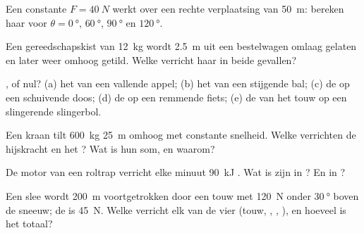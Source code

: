 \begin{exercise}[$\star$]\label{exo:g11:work-of-force:1}
Een constante  $F = \qty{40}{N}$ werkt over een rechte
verplaatsing van \qty{50}{m}: bereken haar  voor
$\theta = \qty{0}{\degree}$, $\qty{60}{\degree}$, $\qty{90}{\degree}$ en
$\qty{120}{\degree}$.
\end{exercise}

\begin{exercise}[$\star$]\label{exo:g11:work-of-force:2}
Een gereedschapskist van \qty{12}{kg} wordt \qty{2.5}{m} uit een
bestelwagen omlaag gelaten en later weer omhoog getild. Welke 
verricht haar  in beide gevallen?
\end{exercise}

\begin{exercise}[$\star$]\label{exo:g11:work-of-force:3}
,  of nul? (a) het  van een vallende appel; (b) het
 van een stijgende bal; (c) de  op een schuivende
doos; (d) de  op een remmende fiets; (e) de  van het
touw op een slingerende slingerbol.
\end{exercise}

\begin{exercise}[$\star$]\label{exo:g11:work-of-force:4}
Een kraan tilt \qty{600}{kg} \qty{25}{m} omhoog met constante snelheid.
Welke  verrichten de hijskracht en het ? Wat is hun som, en
waarom?
\end{exercise}

\begin{exercise}[$\star$]\label{exo:g11:work-of-force:5}
De motor van een roltrap verricht elke minuut \qty{90}{kJ} . Wat is
zijn  in ? En in ?
\end{exercise}

\begin{exercise}[$\star\star$]\label{exo:g11:work-of-force:6}
Een slee wordt \qty{200}{m} voortgetrokken door een touw met 
\qty{120}{N} onder $\qty{30}{\degree}$ boven de sneeuw; de  is
\qty{45}{N}. Welke  verricht elk van de vier  (touw,
, , ), en hoeveel is het totaal?
\end{exercise}

